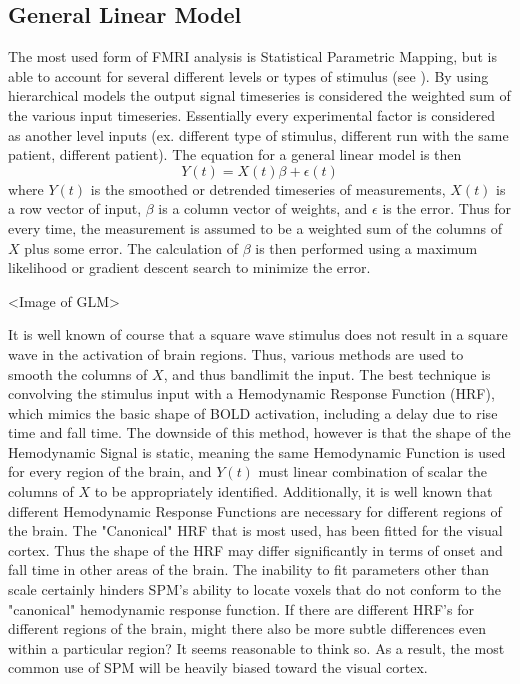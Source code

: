 \documentclass{article}
\begin{document}
\subsection{General Linear Model}
The most used form of FMRI analysis is Statistical Parametric
Mapping, but is able to account for several different levels or types
of stimulus (see \cite{Hofmann1997}). By using hierarchical models
the output signal timeseries is considered the weighted
sum of the various input timeseries. Essentially every experimental factor
is considered as another level inputs (ex. different type of stimulus,
different run with the same patient, different patient). 
The equation for a general linear model is then
\begin{equation}
Y(t) = X(t)\beta + \epsilon(t)
\end{equation}
where $Y(t)$ is the smoothed or detrended timeseries of measurements,
$X(t)$ is a row vector of input, $\beta$ is a column vector of weights,
and $\epsilon$ is the error. Thus for every time, the measurement is
assumed to be a weighted sum of the columns of $X$ plus some error. The calculation
of $\beta$ is then performed using a maximum likelihood or gradient descent search 
to minimize the error.

<Image of GLM>

It is well known of course that a square wave stimulus does not result in a square wave
in the activation of brain regions. Thus, various methods are used to 
smooth the columns of $X$, and thus bandlimit the input. 
The best technique is convolving the stimulus input with a Hemodynamic 
Response Function (HRF), which mimics the basic shape of BOLD activation, including a delay
due to rise time and fall time. The downside of this method, however is that 
the shape of the Hemodynamic Signal is static, meaning the same Hemodynamic Function is
used for every region of the brain, and $Y(t)$ must linear combination 
of scalar the columns of $X$ to be appropriately identified. Additionally, 
it is well known that different Hemodynamic Response Functions are necessary for different 
regions of the brain. The "Canonical" HRF that is most used, has been fitted
for the visual cortex. Thus the shape of the HRF may differ significantly in
terms of onset and fall time in other areas of the brain. The inability to
fit parameters other than scale certainly hinders SPM's
ability to locate voxels that do not conform to the "canonical" hemodynamic 
response function. If there are different HRF's for different regions 
of the brain, might there also be more subtle differences even within
a particular region? It seems reasonable to think so. As a result, the 
most common use of SPM will be heavily biased toward the visual cortex.
\end{document}
